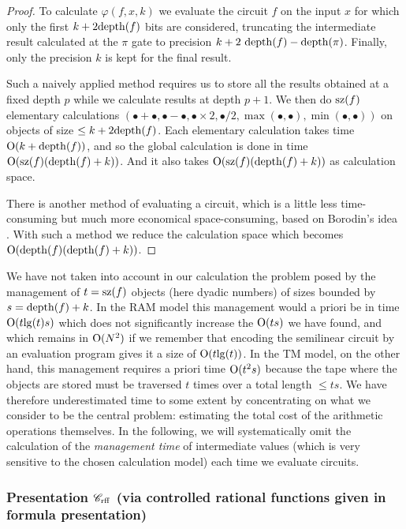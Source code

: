 \begin{proof} 
To calculate $\varphi (f,x,k)$ we evaluate the circuit $f$ on the input $x$ for which only the first $k + 2 {\rm depth}(f)$ bits are considered, truncating the intermediate result calculated at the $\pi$ gate to  precision $k+2\ \depth(f)-\depth(\pi)$. Finally, only the precision $k$ is kept for the final result.

\noindent 
Such a naively applied method requires us to store all the results obtained at a fixed depth $p$ while we calculate results at depth $p+1$.
We then do ${\rm sz}(f)$ elementary calculations 
$(\bullet + \bullet, \bullet - \bullet,\bullet \times 2, \bullet/2, \max(\bullet, \bullet),\min(\bullet, \bullet))$ 
on objects of size $\leq k + 2 {\rm depth}(f)$. Each elementary calculation takes  time ${\rm O}(k+{\rm depth}(f))$, and so the global calculation is done in time ${\rm O}({\rm sz}(f)({\rm depth}(f)+k))$. And it also takes ${\rm O}({\rm sz}(f)({\rm depth}(f)+k))$ as  calculation space.

\noindent 
There is another method of evaluating a circuit, which is a little less time-consuming but much more economical space-consuming, based on Borodin's idea \cite{Bo}. With such a method we reduce the calculation space which becomes ${\rm O}({\rm depth}(f)({\rm depth}(f)+k))$.
\end{proof}


\begin{remark}\label{323}
We have not taken into account in our calculation the problem posed by the management of $t = {\rm sz}(f)$ objects (here dyadic numbers) of sizes bounded by $s = {\rm depth}(f)+k$. In the RAM model this management would a priori be in time ${\rm O}(t {\rm lg}(t) s)$ which does not significantly increase the ${\rm O}(t s)$ we have found, and which remains in ${\rm O}(N^2)$ if we remember that encoding the semilinear circuit by an evaluation program gives it a size of ${\rm O}(t {\rm lg}(t))$. In the TM model, on the other hand, this management requires a priori time ${\rm O}(t^2s)$ because the tape where the objects are stored must be traversed $t$ times over a total length $\leq ts$. We have therefore underestimated time to some extent by concentrating on what we consider to be the central problem: estimating the total cost of the arithmetic operations themselves. In the following, we will systematically omit the calculation of the {\em management time} of intermediate values (which is very sensitive to the chosen calculation model) each time we evaluate circuits.
\end{remark}

\subsubsection{Presentation \texorpdfstring{${{{\mathscr C}}_{\rm rff}}$}{Crff}
(via controlled rational functions given in formula presentation)} 
\label{subsubsec322}

